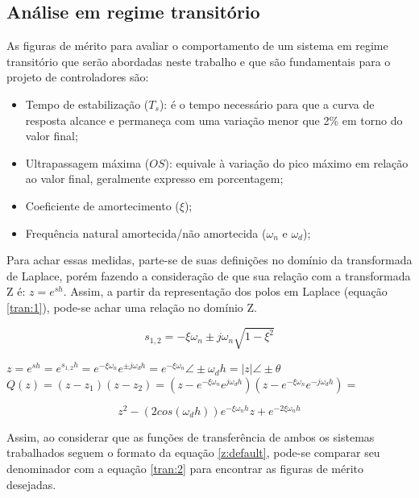 \subsection{Análise em regime transitório}

As figuras de mérito para avaliar o comportamento de um sistema em regime transitório que serão abordadas neste trabalho e que são fundamentais para o projeto de controladores são:

\begin{itemize}
    \item Tempo de estabilização ($T_s$): é o tempo necessário para que a curva de resposta alcance e permaneça com uma variação menor que 2\% em torno do valor final;
    \item Ultrapassagem máxima ($OS$): equivale à variação do pico máximo em relação ao valor final, geralmente expresso em porcentagem;  
    \item Coeficiente de amortecimento ($\xi$);
    \item Frequência natural amortecida/não amortecida ($\omega_n$ e $\omega_d$);
\end{itemize}

Para achar essas medidas, parte-se de suas definições no domínio da transformada de Laplace, porém fazendo a consideração de que sua relação com a transformada Z é: $z = e^{sh}$. Assim, a partir da representação dos polos em Laplace (equação \ref{tran:1}), pode-se achar uma relação no domínio Z.

\begin{equation} \label{tran:1}
    s_{1,2} = -\xi \omega_n \pm j \omega_n \sqrt{1-\xi^2}
\end{equation}

\begin{center}
    $z = e^{sh} = e^{s_{1,2}h} = e^{-\xi \omega_n} e^{\pm j \omega_d h} = e^{-\xi \omega_n}  \angle \pm \omega_d h = |z|\angle \pm \theta $\vspace{4pt}\\
    $Q(z) = (z-z_1)(z-z_2) = (z - e^{-\xi \omega_n} e^{j \omega_d h})(z - e^{-\xi \omega_n} e^{- j \omega_d h}) =$ \vspace{4pt}
\end{center}
\begin{equation} \label{tran:2}
    z^2 - (2 cos(\omega_d h))e^{-\xi \omega_n h}z + e^{-2\xi \omega_n h}
\end{equation}

Assim, ao considerar que as funções de transferência de ambos os sistemas trabalhados seguem o formato da equação \ref{z:default}, pode-se comparar seu denominador com a equação \ref{tran:2} para encontrar as figuras de mérito desejadas.

